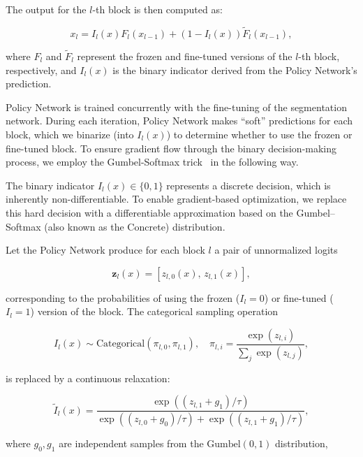 The output for the $l$-th block is then computed as:

\begin{equation}
	x_l = I_l ( x ) F_l ( x_{l-1} ) + (1 - I_l ( x )) \tilde{F}_l ( x_{l-1} ),
\end{equation}

\noindent
where $F_l$ and $\tilde{F}_l$ represent the frozen and fine-tuned versions of the $l$-th block, respectively, and $I_l(x)$ is the binary indicator derived from the Policy Network’s prediction.

Policy Network is trained concurrently with the fine-tuning of the segmentation network. During each iteration, Policy Network makes ``soft'' predictions for each block, which we binarize (into $I_l(x)$) to determine whether to use the frozen or fine-tuned block. To ensure gradient flow through the binary decision-making process, we employ the Gumbel-Softmax trick~\cite{jang2017categorical} in the following way.%

The binary indicator $I_l(x) \in \{0, 1\}$ represents a discrete decision, which is inherently non-differentiable. To enable gradient-based optimization, we replace this hard decision with a differentiable approximation based on the Gumbel–Softmax (also known as the Concrete) distribution.

Let the Policy Network produce for each block $l$ a pair of unnormalized logits

\[
\mathbf{z}_l(x) = [z_{l,0}(x),\, z_{l,1}(x)],
\]

\noindent
corresponding to the probabilities of using the frozen ($I_l=0$) or fine-tuned ($I_l=1$) version of the block. The categorical sampling operation

\[
I_l(x) \sim \mathrm{Categorical}(\pi_{l,0}, \pi_{l,1}), \quad
\pi_{l,i} = \frac{\exp(z_{l,i})}{\sum_{j} \exp(z_{l,j})},
\]

\noindent
is replaced by a continuous relaxation:

\begin{equation}
	\tilde{I}_l(x) =
	\frac{
		\exp\!\left((z_{l,1} + g_1)/\tau\right)
	}{
		\exp\!\left((z_{l,0} + g_0)/\tau\right) +
		\exp\!\left((z_{l,1} + g_1)/\tau\right)
	},
	\label{eq:gumbelsoftmax}
\end{equation}

\noindent
where $g_0, g_1$ are independent samples from the $\mathrm{Gumbel}(0,1)$ distribution,

